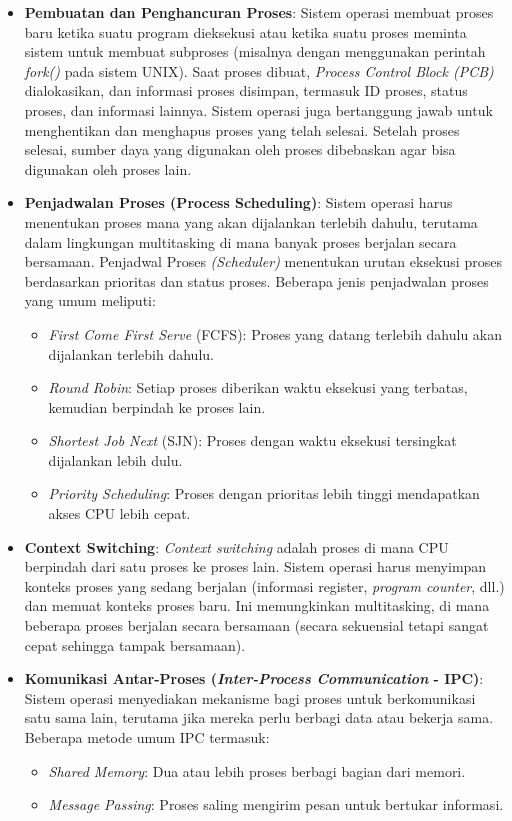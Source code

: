 \documentclass[12pt]{article}
\begin{document}
\begin{itemize}
    \item \textbf{Pembuatan dan Penghancuran Proses}: 
   Sistem operasi membuat proses baru ketika suatu program dieksekusi atau ketika suatu proses meminta sistem untuk membuat subproses (misalnya dengan menggunakan perintah \textit{fork()} pada sistem UNIX). Saat proses dibuat, \textit{Process Control Block (PCB)} dialokasikan, dan informasi proses disimpan, termasuk ID proses, status proses, dan informasi lainnya. Sistem operasi juga bertanggung jawab untuk menghentikan dan menghapus proses yang telah selesai. Setelah proses selesai, sumber daya yang digunakan oleh proses dibebaskan agar bisa digunakan oleh proses lain.
    
    \item \textbf{Penjadwalan Proses (Process Scheduling)}: 
    Sistem operasi harus menentukan proses mana yang akan dijalankan terlebih dahulu, terutama dalam lingkungan multitasking di mana banyak proses berjalan secara bersamaan. Penjadwal Proses\textit{ (Scheduler) }menentukan urutan eksekusi proses berdasarkan prioritas dan status proses. Beberapa jenis penjadwalan proses yang umum meliputi:
    \begin{itemize}
        \item \textit{First Come First Serve }(FCFS): Proses yang datang terlebih dahulu akan dijalankan terlebih dahulu.
        \item \textit{Round Robin}: Setiap proses diberikan waktu eksekusi yang terbatas, kemudian berpindah ke proses lain.
        \item \textit{Shortest Job Next} (SJN): Proses dengan waktu eksekusi tersingkat dijalankan lebih dulu.
        \item \textit{Priority Scheduling}: Proses dengan prioritas lebih tinggi mendapatkan akses CPU lebih cepat.
    \end{itemize}
    
    \item \textbf{Context Switching}: 
    \textit{Context switching} adalah proses di mana CPU berpindah dari satu proses ke proses lain. Sistem operasi harus menyimpan konteks proses yang sedang berjalan (informasi register, \textit{program counter}, dll.) dan memuat konteks proses baru. Ini memungkinkan multitasking, di mana beberapa proses berjalan secara bersamaan (secara sekuensial tetapi sangat cepat sehingga tampak bersamaan).
    
    \item \textbf{Komunikasi Antar-Proses (\textit{Inter-Process Communication} - IPC)}: 
    Sistem operasi menyediakan mekanisme bagi proses untuk berkomunikasi satu sama lain, terutama jika mereka perlu berbagi data atau bekerja sama. Beberapa metode umum IPC termasuk:
    \begin{itemize}
        \item \textit{Shared Memory}: Dua atau lebih proses berbagi bagian dari memori.
        \item \textit{Message Passing}: Proses saling mengirim pesan untuk bertukar informasi.
    \end{itemize}
    

\end{itemize}
\end{document}
